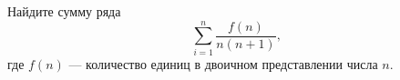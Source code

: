 \documentclass{article}
\begin{document}
Найдите сумму ряда
$$\sum_{i=1}^n \frac{f(n)}{n(n+1)},$$
где $f(n)$ --- количество единиц в двоичном представлении числа $n$.
\end{document}
